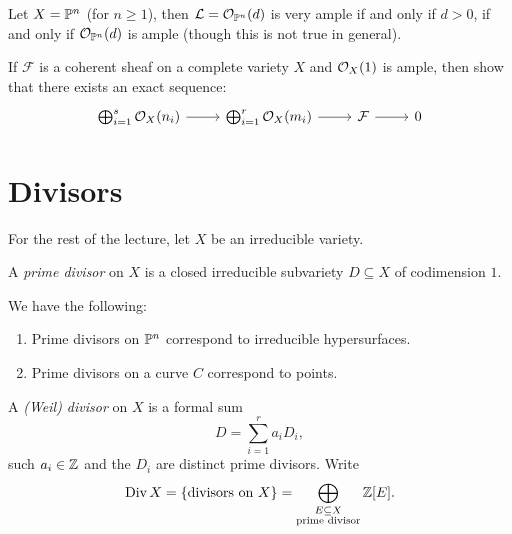 \begin{example}
  Let $X = \mathbb{P}^n$ (for $n \ge 1$), then $\mathcal{L} = \mathcal{O}_{\mathbb{P}^n}(d)$ is very ample
  if and
  only if $d > 0$, if and only if
  $\mathcal{O}_{\mathbb{P}^n}(d)$ is ample (though this is
  not true in general).
\end{example}

\begin{exercise}
  If $\mathcal{F}$ is a coherent sheaf on
  a complete variety $X$ and $\mathcal{O}_X(1)$ is
  ample,
  then show that there exists an exact
  sequence:
  \[
    \begin{tikzcd}
    \bigoplus_{i = 1}^s \OO_X(n_i)
    \ar[r] & \bigoplus_{i = 1}^r \OO_X(m_i)
    \ar[r] & \mathcal{F} \ar[r] & 0
    \end{tikzcd}
  \]
\end{exercise}

\section{Divisors}

\begin{remark}
  For the rest of the lecture,
  let $X$ be an irreducible variety.
\end{remark}

\begin{definition}
  A \emph{prime divisor} on $X$ is a
  closed irreducible subvariety
  $D \subseteq X$ of codimension $1$.
\end{definition}

\begin{example}
  We have the following:
  \begin{enumerate}
    \item Prime divisors on $\mathbb{P}^n$
      correspond to irreducible hypersurfaces.
    \item Prime divisors
      on a curve $C$ correspond to points.
  \end{enumerate}
\end{example}

\begin{definition}
  A \emph{(Weil) divisor} on $X$ is a
  formal sum
  \[
    D = \sum_{i = 1}^r a_i D_i,
  \]
  such $a_i \in \mathbb{Z}$ and the $D_i$ are
  distinct prime divisors. Write
  \[
    \operatorname{Div} X
    = \{\text{divisors on $X$}\}
    = \bigoplus_{\substack{E \subseteq X \\ \text{prime divisor}}} \mathbb{Z}[E].
  \]
\end{definition}

